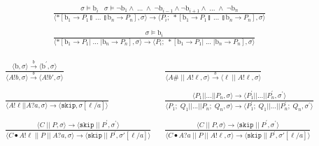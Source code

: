 \documentclass[times,10pt]{article}
\begin{document}
\begin{align*}
\frac{\sigma \models \textrm{b}_i \;\;\; \sigma \models \lnot \mathrm{b}_1 \wedge \; ... \; \wedge \; \lnot \mathrm{b}_{i-1} \wedge \lnot \mathrm{b}_{i+1} \wedge \; ... \; \wedge \; \lnot\mathrm{b}_n } {\langle *[ \mathrm{b}_1 \rightarrow P_1  \talloblong \; ... \; \talloblong \mathrm{b}_n \rightarrow P_n ] , \sigma \rangle \rightarrow \langle P_i; \; *[ \mathrm{b}_1 \rightarrow P_1  \talloblong \; ... \; \talloblong \mathrm{b}_n \rightarrow P_n ] , \sigma\rangle  } \\
\\ \frac{\sigma \models \textrm{b}_i} {\langle *[ \mathrm{b}_1 \rightarrow P_1  | \; ... \; | \mathrm{b}_n \rightarrow P_n ] , \sigma \rangle \rightarrow \langle P_i;\;*[ \mathrm{b}_1 \rightarrow P_1  | \; ... \; | \mathrm{b}_n \rightarrow P_n ] , \sigma\rangle  }
\end{align*}

\begin{align*}
\frac{\langle \textrm{b}, \sigma \rangle \overset{b}{\rightarrow} \langle \textrm{b}^\prime, \sigma \rangle}{\langle A!b, \sigma\rangle \overset{b}{\rightarrow}  \langle A!b', \sigma \rangle} &\;\; 
\frac{}{\langle A\# \; || \; A!\ell , \sigma\rangle \overset{b}{\rightarrow} \langle \ell \;||\;A!\ell, \sigma \rangle} \\ \\
\frac{} {\langle A!\ell || A?a, \sigma \rangle \rightarrow \langle \mathtt{skip} ,\sigma[\ell/a] \rangle} &\;\; 
\frac{\langle P_1 || ... || P_n, \sigma \rangle \rightarrow \langle P_1^\prime || ... || P_n^\prime, \sigma^\prime \rangle } {\langle P_1;\;Q_1 || ... || P_n;\;Q_n, \sigma \rangle \rightarrow \langle P_1^\prime;\;Q_1 || ... || P_n^\prime;\; Q_n, \sigma^\prime \rangle } \\ \\
\frac{ \langle C \; || \; P, \sigma \rangle \rightarrow \langle \mathtt{skip} \; || \; P^\prime, \sigma^\prime \rangle }{ \langle C \bullet A!\ell \; || \; P \; || \; A?a , \sigma \rangle
\rightarrow \langle \mathtt{skip} \; || \; P^\prime,  \sigma'[\ell/a]  \rangle } & \;\;
\frac{ \langle C \; || \; P, \sigma \rangle \rightarrow \langle \mathtt{skip} \; || \; P^\prime, \sigma^\prime \rangle }{ \langle C \bullet A?a \; || \; P \; || \; A!\ell , \sigma \rangle
\rightarrow \langle \mathtt{skip} \; || \; P^\prime,  \sigma'[\ell/a]  \rangle }
\end{align*}
\end{document}
